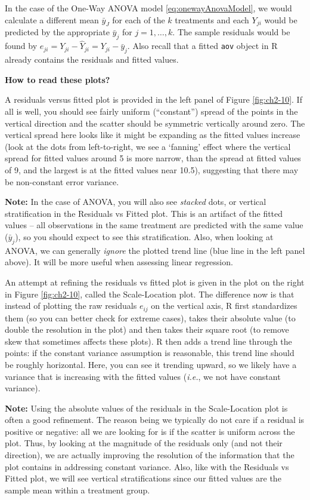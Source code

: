 \documentclass[
]{book}
\begin{document}
In the case of the One-Way ANOVA model \eqref{eq:onewayAnovaModel}, we would calculate a different mean \(\bar{y}_J\) for each of the \(k\) treatments and each \(Y_{ji}\) would be predicted by the appropriate \(\bar{y}_j\) for \(j=1,\ldots,k\).
The sample residuals would be found by \(e_{ji} = Y_{ji} - \hat{Y}_{ji} = Y_{ji} - \bar{y}_j\).
Also recall that a fitted \texttt{aov} object in R already contains the residuals and fitted values.

\textbf{How to read these plots?}

A residuals versus fitted plot is provided in the left panel of Figure \ref{fig:ch2-10}.
If all is well, you should see fairly uniform (``constant'') spread of the points in the vertical direction and the scatter should be symmetric vertically around zero.
The vertical spread here looks like it might be expanding as the fitted values increase (look at the dots from left-to-right, we see a `fanning' effect where the vertical spread for fitted values around 5 is more narrow, than the spread at fitted values of 9, and the largest is at the fitted values near 10.5), suggesting that there may be non-constant error variance.

\textbf{Note:} In the case of ANOVA, you will also see \emph{stacked} dots, or vertical stratification in the Residuals vs Fitted plot. This is an artifact of the fitted values -- all observations in the same treatment are predicted with the same value (\(\bar{y}_j\)), so you should expect to see this stratification. Also, when looking at ANOVA, we can generally \emph{ignore} the plotted trend line (blue line in the left panel above). It will be more useful when assessing linear regression.

An attempt at refining the residuals vs fitted plot is given in the plot on the right in Figure \ref{fig:ch2-10}, called the Scale-Location plot.
The difference now is that instead of plotting the raw residuals \(e_{ij}\) on the vertical axis, R first standardizes them (so you can better check for extreme cases), takes their absolute value (to double the resolution in the plot) and then takes their square root (to remove skew that sometimes affects these plots).
R then adds a trend line through the points: if the constant variance assumption is reasonable, this trend line should be roughly horizontal.
Here, you can see it trending upward, so we likely have a variance that is increasing with the fitted values (\emph{i.e.}, we not have constant variance).

\textbf{Note:} Using the absolute values of the residuals in the Scale-Location plot is often a good refinement.
The reason being we typically do not care if a residual is positive or negative: all we are looking for is if the scatter is uniform across the plot.
Thus, by looking at the magnitude of the residuals only (and not their direction), we are actually improving the resolution of the information that the plot contains in addressing constant variance.
Also, like with the Residuals vs Fitted plot, we will see vertical stratifications since our fitted values are the sample mean within a treatment group.
\end{document}

